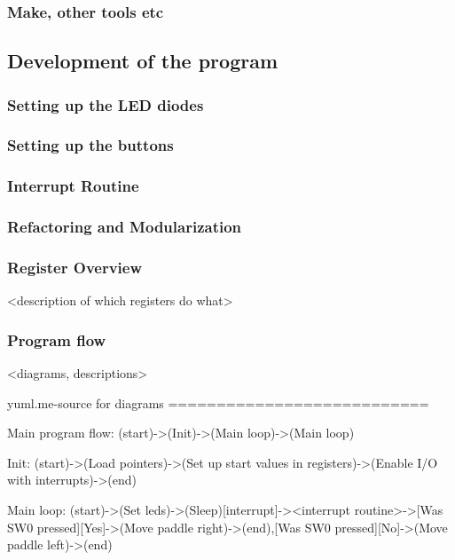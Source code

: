\documentclass{article}
\begin{document}
\subsubsection{Make, other tools etc}

\subsection{Development of the program}

\subsubsection{Setting up the LED diodes}

\subsubsection{Setting up the buttons}

\subsubsection{Interrupt Routine}

\subsubsection{Refactoring and Modularization}

\subsubsection{Register Overview}

<description of which registers do what>

\subsubsection{Program flow}

<diagrams, descriptions>

yuml.me-source for diagrams
===========================

Main program flow:
(start)->(Init)->(Main loop)->(Main loop)


Init:
(start)->(Load pointers)->(Set up start values in registers)->(Enable I/O with interrupts)->(end)

Main loop:
(start)->(Set leds)->(Sleep)[interrupt]-><interrupt routine>->[Was SW0 pressed][Yes]->(Move paddle right)->(end),[Was SW0 pressed][No]->(Move paddle left)->(end)
\end{document}
